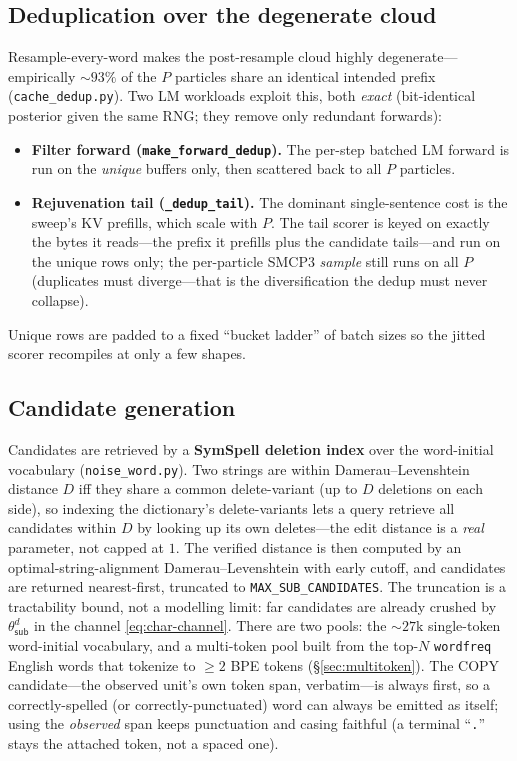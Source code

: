 \documentclass[11pt]{article}
\providecommand{\subact}{\textsf{sub}}
\providecommand{\code}[1]{\texttt{#1}}
\begin{document}
\subsection{Deduplication over the degenerate cloud}
\label{sec:dedup}

Resample-every-word makes the post-resample cloud highly degenerate---empirically $\sim\!93\%$ of the $P$ particles share an identical intended prefix (\code{cache\_dedup.py}). Two LM workloads exploit this, both \emph{exact} (bit-identical posterior given the same RNG; they remove only redundant forwards):
\begin{itemize}[leftmargin=1.6em,itemsep=1pt]
\item \textbf{Filter forward (\code{make\_forward\_dedup}).} The per-step batched LM forward is run on the \emph{unique} buffers only, then scattered back to all $P$ particles.
\item \textbf{Rejuvenation tail (\code{\_dedup\_tail}).} The dominant single-sentence cost is the sweep's KV prefills, which scale with $P$. The tail scorer is keyed on exactly the bytes it reads---the prefix it prefills plus the candidate tails---and run on the unique rows only; the per-particle SMCP3 \emph{sample} still runs on all $P$ (duplicates must diverge---that is the diversification the dedup must never collapse).
\end{itemize}
Unique rows are padded to a fixed ``bucket ladder'' of batch sizes so the jitted scorer recompiles at only a few shapes.

\subsection{Candidate generation}
\label{sec:candidates}

Candidates are retrieved by a \textbf{SymSpell deletion index} over the word-initial vocabulary (\code{noise\_word.py}). Two strings are within Damerau--Levenshtein distance $D$ iff they share a common delete-variant (up to $D$ deletions on each side), so indexing the dictionary's delete-variants lets a query retrieve all candidates within $D$ by looking up its own deletes---the edit distance is a \emph{real} parameter, not capped at $1$. The verified distance is then computed by an optimal-string-alignment Damerau--Levenshtein with early cutoff, and candidates are returned nearest-first, truncated to \code{MAX\_SUB\_CANDIDATES}. The truncation is a tractability bound, not a modelling limit: far candidates are already crushed by $\theta_{\subact}^{d}$ in the channel \eqref{eq:char-channel}. There are two pools: the $\sim\!27$k single-token word-initial vocabulary, and a multi-token pool built from the top-$N$ \code{wordfreq} English words that tokenize to $\ge 2$ BPE tokens (\S\ref{sec:multitoken}). The COPY candidate---the observed unit's own token span, verbatim---is always first, so a correctly-spelled (or correctly-punctuated) word can always be emitted as itself; using the \emph{observed} span keeps punctuation and casing faithful (a terminal ``\code{.}'' stays the attached token, not a spaced one).
\end{document}
